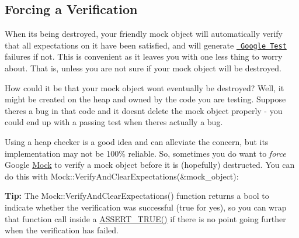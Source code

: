 \subsection*{Forcing a Verification}

When it\textquotesingle{}s being destroyed, your friendly mock object will automatically verify that all expectations on it have been satisfied, and will generate \href{../../googletest/}{\texttt{ Google Test}} failures if not. This is convenient as it leaves you with one less thing to worry about. That is, unless you are not sure if your mock object will be destroyed.

How could it be that your mock object won\textquotesingle{}t eventually be destroyed? Well, it might be created on the heap and owned by the code you are testing. Suppose there\textquotesingle{}s a bug in that code and it doesn\textquotesingle{}t delete the mock object properly -\/ you could end up with a passing test when there\textquotesingle{}s actually a bug.

Using a heap checker is a good idea and can alleviate the concern, but its implementation may not be 100\% reliable. So, sometimes you do want to {\itshape force} Google \mbox{\hyperlink{class_mock}{Mock}} to verify a mock object before it is (hopefully) destructed. You can do this with {\ttfamily Mock\+::\+Verify\+And\+Clear\+Expectations(\&mock\+\_\+object)}\+:


\begin{DoxyCode}{0}
\DoxyCodeLine{}
\DoxyCodeLine{}
\DoxyCodeLine{}
\end{DoxyCode}


{\bfseries{Tip\+:}} The {\ttfamily Mock\+::\+Verify\+And\+Clear\+Expectations()} function returns a {\ttfamily bool} to indicate whether the verification was successful ({\ttfamily true} for yes), so you can wrap that function call inside a {\ttfamily \mbox{\hyperlink{googletest-master_2googletest_2include_2gtest_2gtest_8h_ae9244bfbda562e8b798789b001993fa5}{A\+S\+S\+E\+R\+T\+\_\+\+T\+R\+U\+E()}}} if there is no point going further when the verification has failed.

